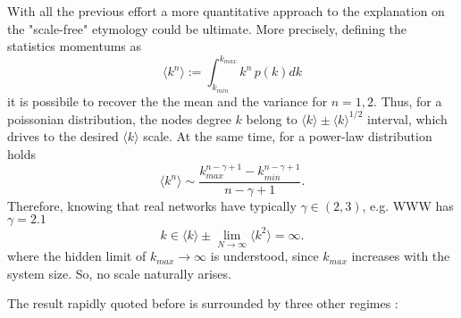 \documentclass[a4paper,12pt,twoside]{book} %
\theoremstyle{definition}
\begin{document}
With all the previous effort a more quantitative approach to the explanation on the "scale-free" etymology could be ultimate.
More precisely, defining the statistics momentums as
\begin{equation}
	\langle k^n \rangle := \int_{k_{min}}^{k_{max}} k^n\, p(k) dk
\end{equation}
it is possibile to recover the the mean and the variance for $n = 1,2$.
Thus, for a poissonian distribution, the nodes degree $k$ belong to $\langle k \rangle \pm  \langle k \rangle ^ {1/2}$ interval, which drives to the desired $\langle k \rangle$ scale. At the same time, for a power-law distribution holds	
\begin{equation}
	\langle k^n \rangle \sim \frac{k_{max}^{n-\gamma+1}-k_{min}^{n-\gamma+1}}{n-\gamma+1}
	.
\end{equation}
Therefore, knowing that real networks have typically $\gamma \in (2,3)$, e.g. WWW has $\gamma =  2.1$ \cite{barabasi::2016networkbook}
\begin{equation}
	k \in \langle k \rangle \pm \lim_{N \to \infty} \langle k^2 \rangle = \infty.
\end{equation}
where the hidden limit of \( k_{max} \to \infty \) is understood, since $k_{max}$ increases with the system size. 
So, no scale naturally arises.

The result rapidly quoted before is surrounded by three other regimes 
\cite{Cohen:2003_SFUSW}:
\end{document}

